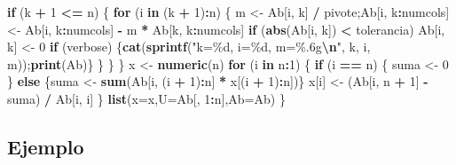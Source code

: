 \documentclass[
]{book}
\newenvironment{Shaded}{\begin{snugshade}}{\end{snugshade}}
\newcommand{\AttributeTok}[1]{\textcolor[rgb]{0.13,0.29,0.53}{#1}}
\newcommand{\ControlFlowTok}[1]{\textcolor[rgb]{0.13,0.29,0.53}{\textbf{#1}}}
\newcommand{\DecValTok}[1]{\textcolor[rgb]{0.00,0.00,0.81}{#1}}
\newcommand{\FunctionTok}[1]{\textcolor[rgb]{0.13,0.29,0.53}{\textbf{#1}}}
\newcommand{\NormalTok}[1]{#1}
\newcommand{\OtherTok}[1]{\textcolor[rgb]{0.56,0.35,0.01}{#1}}
\newcommand{\SpecialCharTok}[1]{\textcolor[rgb]{0.81,0.36,0.00}{\textbf{#1}}}
\newcommand{\StringTok}[1]{\textcolor[rgb]{0.31,0.60,0.02}{#1}}
\begin{document}
\begin{Shaded}
\begin{Highlighting}[]
    \ControlFlowTok{if}\NormalTok{ (k }\SpecialCharTok{+} \DecValTok{1} \SpecialCharTok{\textless{}=}\NormalTok{ n) \{}
      \ControlFlowTok{for}\NormalTok{ (i }\ControlFlowTok{in}\NormalTok{ (k }\SpecialCharTok{+} \DecValTok{1}\NormalTok{)}\SpecialCharTok{:}\NormalTok{n) \{}
\NormalTok{        m }\OtherTok{\textless{}{-}}\NormalTok{ Ab[i, k] }\SpecialCharTok{/}\NormalTok{ pivote;Ab[i, k}\SpecialCharTok{:}\NormalTok{numcols] }\OtherTok{\textless{}{-}}\NormalTok{ Ab[i, k}\SpecialCharTok{:}\NormalTok{numcols] }\SpecialCharTok{{-}}\NormalTok{ m }\SpecialCharTok{*}\NormalTok{ Ab[k, k}\SpecialCharTok{:}\NormalTok{numcols]}
        \ControlFlowTok{if}\NormalTok{ (}\FunctionTok{abs}\NormalTok{(Ab[i, k]) }\SpecialCharTok{\textless{}}\NormalTok{ tolerancia) Ab[i, k] }\OtherTok{\textless{}{-}} \DecValTok{0}
        \ControlFlowTok{if}\NormalTok{ (verbose) \{}\FunctionTok{cat}\NormalTok{(}\FunctionTok{sprintf}\NormalTok{(}\StringTok{"k=\%d, i=\%d, m=\%.6g}\SpecialCharTok{\textbackslash{}n}\StringTok{"}\NormalTok{, k, i, m));}\FunctionTok{print}\NormalTok{(Ab)\}}
\NormalTok{      \}}
\NormalTok{    \}}
\NormalTok{  \}}
\NormalTok{  x }\OtherTok{\textless{}{-}} \FunctionTok{numeric}\NormalTok{(n)}
  \ControlFlowTok{for}\NormalTok{ (i }\ControlFlowTok{in}\NormalTok{ n}\SpecialCharTok{:}\DecValTok{1}\NormalTok{) \{}
    \ControlFlowTok{if}\NormalTok{ (i }\SpecialCharTok{==}\NormalTok{ n) \{}
\NormalTok{      suma }\OtherTok{\textless{}{-}} \DecValTok{0}
\NormalTok{    \} }\ControlFlowTok{else}\NormalTok{ \{suma }\OtherTok{\textless{}{-}} \FunctionTok{sum}\NormalTok{(Ab[i, (i }\SpecialCharTok{+} \DecValTok{1}\NormalTok{)}\SpecialCharTok{:}\NormalTok{n] }\SpecialCharTok{*}\NormalTok{ x[(i }\SpecialCharTok{+} \DecValTok{1}\NormalTok{)}\SpecialCharTok{:}\NormalTok{n])\}}
\NormalTok{    x[i] }\OtherTok{\textless{}{-}}\NormalTok{ (Ab[i, n }\SpecialCharTok{+} \DecValTok{1}\NormalTok{] }\SpecialCharTok{{-}}\NormalTok{ suma) }\SpecialCharTok{/}\NormalTok{ Ab[i, i]}
\NormalTok{  \}}
  \FunctionTok{list}\NormalTok{(}\AttributeTok{x=}\NormalTok{x,}\AttributeTok{U=}\NormalTok{Ab[, }\DecValTok{1}\SpecialCharTok{:}\NormalTok{n],}\AttributeTok{Ab=}\NormalTok{Ab)}
\NormalTok{\}}
\end{Highlighting}
\end{Shaded}

\subsection{Ejemplo}\label{ejemplo}
\end{document}
